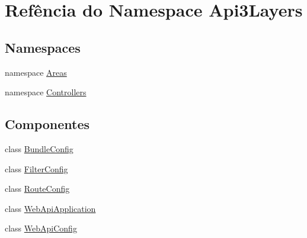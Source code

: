 \hypertarget{namespaceApi3Layers}{}\section{Refência do Namespace Api3\+Layers}
\label{namespaceApi3Layers}
\subsection*{Namespaces}
\begin{DoxyCompactItemize}
\item 
namespace \hyperlink{namespaceApi3Layers_1_1Areas}{Areas}
\item 
namespace \hyperlink{namespaceApi3Layers_1_1Controllers}{Controllers}
\end{DoxyCompactItemize}
\subsection*{Componentes}
\begin{DoxyCompactItemize}
\item 
class \hyperlink{classApi3Layers_1_1BundleConfig}{Bundle\+Config}
\item 
class \hyperlink{classApi3Layers_1_1FilterConfig}{Filter\+Config}
\item 
class \hyperlink{classApi3Layers_1_1RouteConfig}{Route\+Config}
\item 
class \hyperlink{classApi3Layers_1_1WebApiApplication}{Web\+Api\+Application}
\item 
class \hyperlink{classApi3Layers_1_1WebApiConfig}{Web\+Api\+Config}
\end{DoxyCompactItemize}
